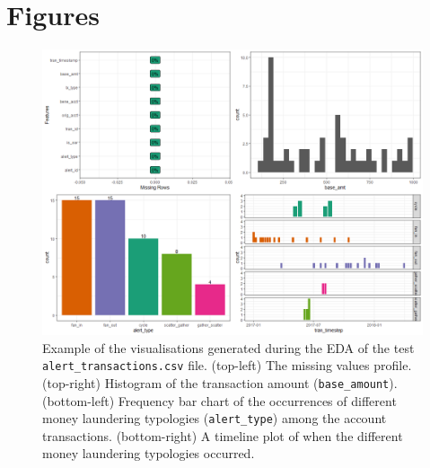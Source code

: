 \chapter{Figures} \label{app_2}

\begin{figure}[]
	\begin{center}
		\includegraphics[scale=0.5]{fig/CH3/test_alrt_trans_summary.png}
		\caption{Example of the visualisations generated during the EDA of the test \texttt{alert\_transactions.csv} file. (top-left) The missing values profile. (top-right) Histogram of the transaction amount (\texttt{base\_amount}). (bottom-left) Frequency bar chart of the occurrences of different money laundering typologies (\texttt{alert\_type}) among the account transactions. (bottom-right) A timeline plot of when the different money laundering typologies occurred.}
		\label{fig:ch3_raw_eda_test_alrt_trans_sum}
	\end{center}	
\end{figure}

